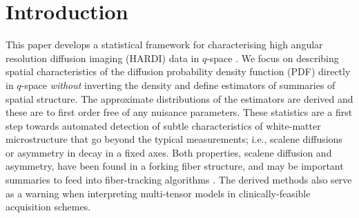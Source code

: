 \documentclass[dvips,aoas,preprint]{imsart}
\numberwithin{equation}{section}
\theoremstyle{plain}
\begin{document}
\begin{frontmatter}

\begin{keyword}
\end{keyword}

\end{frontmatter}

\section{Introduction}
\label{intro}

This paper develops a statistical framework for characterising high
angular resolution diffusion imaging (HARDI) data in $q$-space
\citep{tuc-etal:high}.  We focus on describing spatial characteristics
of the diffusion probability density function (PDF) directly in
$q$-space {\em without} inverting the density and define estimators of
summaries of spatial structure.  The approximate distributions of the
estimators are derived and these are to first order free of any
nuisance parameters.  These statistics are a first step towards
automated detection of subtle characteristics of white-matter
microstructure that go beyond the typical measurements; i.e., scalene
diffusions or asymmetry in decay in a fixed axes.  Both properties,
scalene diffusion and asymmetry, have been found in a forking fiber
structure, and may be important summaries to feed into fiber-tracking
algorithms \citep{mor-zij:fiber-tracking}.  The derived methods also
serve as a warning when interpreting multi-tensor models in
clinically-feasible acquisition schemes.
\end{document}
